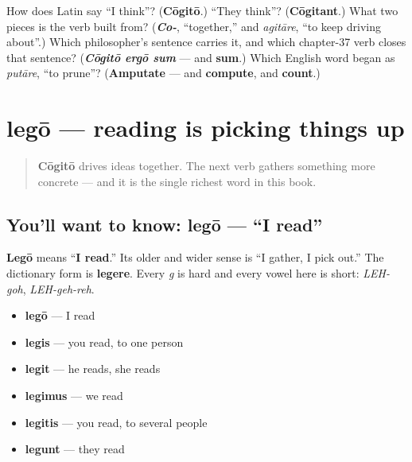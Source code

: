 \begin{tcolorbox}[breakable,colback=teal!4,colframe=teal!35!black,title={Before you move on}]
How does Latin say \textquotedblleft{}I think\textquotedblright{}? (\textbf{Cōgitō}.) \textquotedblleft{}They think\textquotedblright{}? (\textbf{Cōgitant}.) What two pieces is the verb built from? (\emph{\textbf{Co-}}, \textquotedblleft{}together,\textquotedblright{} and \emph{agitāre}, \textquotedblleft{}to keep driving about\textquotedblright{}.) Which philosopher's sentence carries it, and which chapter-37 verb closes that sentence? (\emph{\textbf{Cōgitō ergō sum}} — and \textbf{sum}.) Which English word began as \emph{putāre}, \textquotedblleft{}to prune\textquotedblright{}? (\textbf{Amputate} — and \textbf{compute}, and \textbf{count}.)
\end{tcolorbox}
\section[legō, legere]{legō — reading is picking things up}

\label{lesson:LA-C38-lego}



\begin{quote}
\textbf{Cōgitō} drives ideas together. The next verb gathers something more concrete — and it is the single richest word in this book.
\end{quote}

\subsection*{You'll want to know: legō — \textquotedblleft{}I read\textquotedblright{}}
\textbf{Legō} means \textquotedblleft{}\textbf{I read}.\textquotedblright{} Its older and wider sense is \textquotedblleft{}I gather, I pick out.\textquotedblright{} The dictionary form is \textbf{legere}. Every \emph{g} is hard and every vowel here is short: \emph{LEH-goh}, \emph{LEH-geh-reh}.

\begin{itemize}
\raggedright
  \item \textbf{legō} — I read
  \item \textbf{legis} — you read, to one person
  \item \textbf{legit} — he reads, she reads
  \item \textbf{legimus} — we read
  \item \textbf{legitis} — you read, to several people
  \item \textbf{legunt} — they read
\end{itemize}

